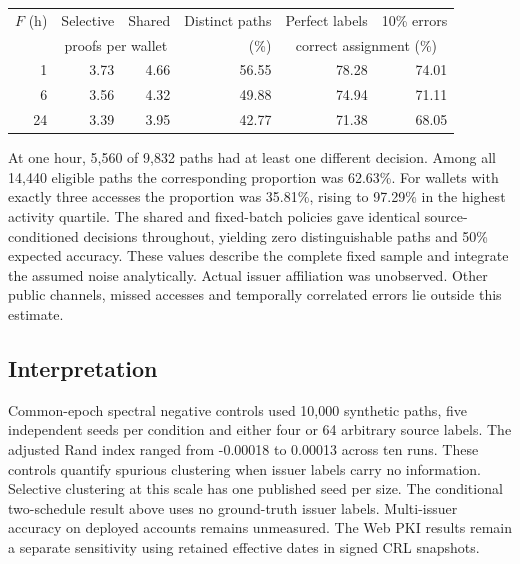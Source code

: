 \begin{center}
\small
\begin{tabular}{rrrrrr}
\hline
$F$ (h) & Selective & Shared & Distinct paths & Perfect labels & 10\% errors \\
 & \multicolumn{2}{c}{proofs per wallet} & (\%) & \multicolumn{2}{c}{correct assignment (\%)} \\
\hline
1 & 3.73 & 4.66 & 56.55 & 78.28 & 74.01 \\
6 & 3.56 & 4.32 & 49.88 & 74.94 & 71.11 \\
24 & 3.39 & 3.95 & 42.77 & 71.38 & 68.05 \\
\hline
\end{tabular}
\end{center}

At one hour, 5,560 of 9,832 paths had at least one different decision. Among all 14,440 eligible paths the corresponding proportion was 62.63\%. For wallets with exactly three accesses the proportion was 35.81\%, rising to 97.29\% in the highest activity quartile. The shared and fixed-batch policies gave identical source-conditioned decisions throughout, yielding zero distinguishable paths and 50\% expected accuracy. These values describe the complete fixed sample and integrate the assumed noise analytically. Actual issuer affiliation was unobserved. Other public channels, missed accesses and temporally correlated errors lie outside this estimate.

\subsection{Interpretation}

Common-epoch spectral negative controls used 10,000 synthetic paths, five independent seeds per condition and either four or 64 arbitrary source labels. The adjusted Rand index ranged from -0.00018 to 0.00013 across ten runs. These controls quantify spurious clustering when issuer labels carry no information. Selective clustering at this scale has one published seed per size. The conditional two-schedule result above uses no ground-truth issuer labels. Multi-issuer accuracy on deployed accounts remains unmeasured. The Web PKI results remain a separate sensitivity using retained effective dates in signed CRL snapshots.
